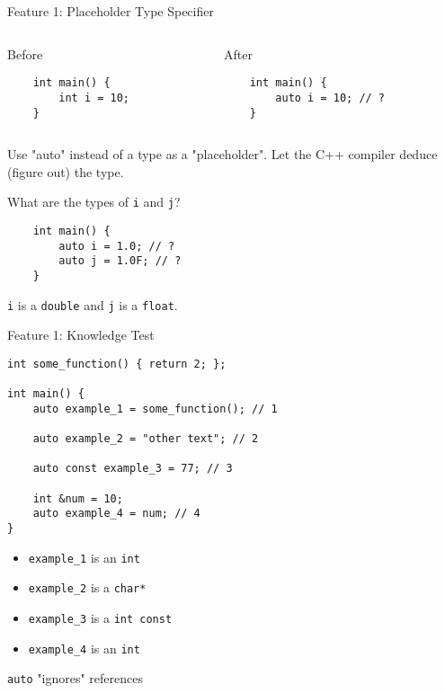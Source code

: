 \documentclass[t]{beamer}
\begin{document}
\begin{frame}[fragile]{Feature 1: Placeholder Type Specifier}
	\begin{columns}[]
		\begin{column}{.5\textwidth}
			{\large Before}
			\begin{verbatim}
	int main() {
		int i = 10;
	}
				\end{verbatim}
		\end{column}
		\pause
		\begin{column}{.5\textwidth}
			{\large After}
			\begin{verbatim}
	int main() {
		auto i = 10; // ?
	}
				\end{verbatim}
		\end{column}
	\end{columns}


	\pause
	\bigskip
	Use "auto" instead of a type as a "placeholder". Let the C++ compiler deduce (figure out) the type.
	\bigskip

	What are the types of \texttt{i} and \texttt{j}?
	\smallskip
	\begin{verbatim}
	int main() {
		auto i = 1.0; // ?
		auto j = 1.0F; // ?
	}
	\end{verbatim}
	\pause

	\bigskip
	\texttt{i} is a \texttt{double} and \texttt{j} is a \texttt{float}.


\end{frame}


\begin{frame}[fragile]{Feature 1: Knowledge Test}
	\begin{verbatim}
int some_function() { return 2; };

int main() {
	auto example_1 = some_function(); // 1

	auto example_2 = "other text"; // 2

	auto const example_3 = 77; // 3

	int &num = 10;
	auto example_4 = num; // 4
}
	\end{verbatim}

	\begin{itemize}
		\pause
		\item \texttt{example\_1} is an \texttt{int}
		      \pause
		\item \texttt{example\_2} is a \texttt{char*}
		      \pause
		\item \texttt{example\_3} is a \texttt{int const}
		      \pause
		\item \texttt{example\_4} is an \texttt{int}
	\end{itemize}

	\medbreak
	\texttt{auto} "ignores" references
\end{frame}
\end{document}
